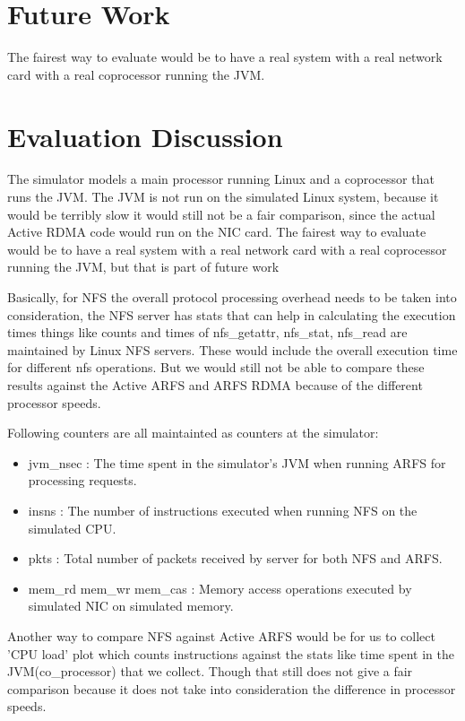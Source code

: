 \documentclass[10pt]{article}
\begin{document}

\section{Future Work}
The fairest way to evaluate would be to have a real system with a real network card
with a real coprocessor running the JVM.

\section{Evaluation Discussion}
The simulator models a main processor running Linux and a coprocessor that
runs the JVM. The JVM is not run on the simulated Linux system, because
it would be terribly slow it would still not be a fair comparison, since
the actual Active RDMA code would run on the NIC card. The fairest
way to evaluate would be to have a real system with a real network card
with a real coprocessor running the JVM, but that is part of future work


Basically, for NFS the overall protocol processing overhead needs to be
taken into consideration, the NFS server has stats that can help
in calculating the execution times things like counts and times of
nfs_getattr, nfs_stat, nfs_read are maintained by Linux NFS servers. These
would include the overall execution time for different nfs operations. But 
we would still not be able to compare these results against the Active ARFS
and ARFS RDMA because of the different processor speeds.

Following counters are all maintainted as counters at the simulator:
\begin{itemize}
\item jvm_nsec : The time spent in the simulator's JVM when running ARFS for processing requests.
\item  insns : The number of instructions executed when running NFS on the simulated CPU.
\item pkts : Total number of packets received by server for both NFS and ARFS.
\item mem_rd mem_wr mem_cas : Memory access operations executed by simulated NIC on simulated memory.
\end{itemize}

Another way to compare NFS against Active ARFS would be for us to collect
'CPU load' plot which counts instructions against the stats like
time spent in the JVM(co_processor) that we collect. Though that still
does not give a fair comparison because it does not take into consideration
the difference in processor speeds.
\end{document}
